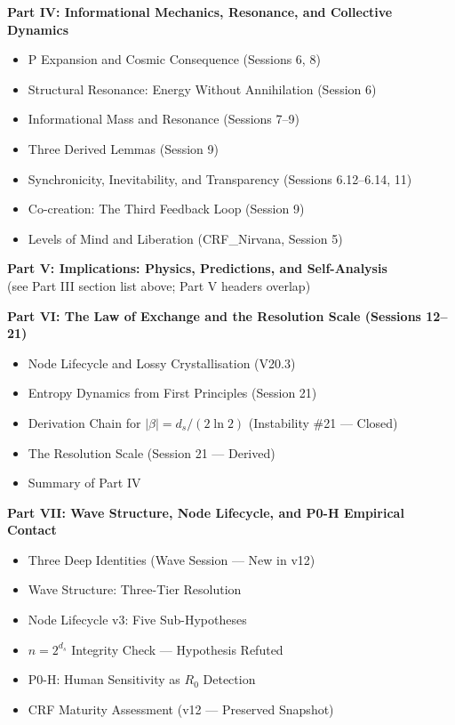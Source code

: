 \documentclass[11pt, a4paper]{article}
\begin{document}
\begin{contentsbox}[title={Part A --- Part and Section Headers}]
\textbf{Part IV: Informational Mechanics, Resonance, and Collective Dynamics}
\begin{itemize}[noitemsep,leftmargin=1.5em]
  \item P Expansion and Cosmic Consequence (Sessions 6, 8)
  \item Structural Resonance: Energy Without Annihilation (Session 6)
  \item Informational Mass and Resonance (Sessions 7--9)
  \item Three Derived Lemmas (Session 9)
  \item Synchronicity, Inevitability, and Transparency (Sessions 6.12--6.14, 11)
  \item Co-creation: The Third Feedback Loop (Session 9)
  \item Levels of Mind and Liberation (CRF\_Nirvana, Session 5)
\end{itemize}

\textbf{Part V: Implications: Physics, Predictions, and Self-Analysis}\\
(see Part III section list above; Part V headers overlap)

\textbf{Part VI: The Law of Exchange and the Resolution Scale (Sessions 12--21)}
\begin{itemize}[noitemsep,leftmargin=1.5em]
  \item Node Lifecycle and Lossy Crystallisation (V20.3)
  \item Entropy Dynamics from First Principles (Session 21)
  \item Derivation Chain for $|\beta| = d_s/(2\ln 2)$ (Instability \#21 --- Closed)
  \item The Resolution Scale (Session 21 --- Derived)
  \item Summary of Part IV
\end{itemize}

\textbf{Part VII: Wave Structure, Node Lifecycle, and P0-H Empirical Contact}
\begin{itemize}[noitemsep,leftmargin=1.5em]
  \item Three Deep Identities (Wave Session --- New in v12)
  \item Wave Structure: Three-Tier Resolution
  \item Node Lifecycle v3: Five Sub-Hypotheses
  \item $n = 2^{d_s}$ Integrity Check --- Hypothesis Refuted
  \item P0-H: Human Sensitivity as $R_0$ Detection
  \item CRF Maturity Assessment (v12 --- Preserved Snapshot)
\end{itemize}


\end{contentsbox}
\end{document}
